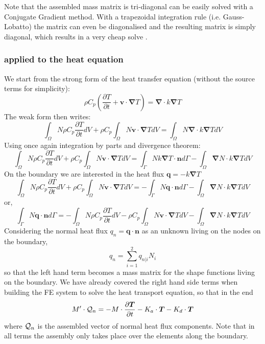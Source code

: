 Note that the assembled mass matrix is tri-diagonal can be easily solved with 
a Conjugate Gradient method. With a trapezoidal integration rule 
(i.e. Gauss-Lobatto) the matrix can even be diagonalised and the resulting 
matrix is simply diagonal, which results in a very cheap solve \cite{zhgh93}.

\subsubsection{applied to the heat equation}
We start from the strong form of the heat transfer equation (without the source terms for simplicity):
\[
\rho C_p
\left(\frac{\partial T}{\partial t} + {\bm v}\cdot {\bm \nabla}T\right)
=
{\bm \nabla} \cdot k{\bm \nabla T}
\]
The weak form then writes:
\[
\int_\Omega N
\rho C_p
\frac{\partial T}{\partial t} dV 
+
\rho C_p
\int_\Omega N
 {\bm v}\cdot {\bm \nabla}T  dV
=
\int_\Omega N
{\bm \nabla} \cdot k{\bm \nabla T} dV
\]
Using once again integration by parts and divergence theorem:
\[
\int_\Omega N
\rho C_p
\frac{\partial T}{\partial t} dV 
+
\rho C_p
\int_\Omega N
 {\bm v}\cdot {\bm \nabla}T  dV
=
\int_\Gamma N k {\bm \nabla T} \cdot {\bm n} d\Gamma
-
\int_\Omega  {\bm \nabla} N \cdot k{\bm \nabla T} dV
\]
On the boundary we are interested in the heat flux ${\bm q}=-k {\bm \nabla T}$
\[
\int_\Omega N
\rho C_p
\frac{\partial T}{\partial t} dV 
+
\rho C_p
\int_\Omega N
 {\bm v}\cdot {\bm \nabla}T  dV
=
-\int_\Gamma N {\bm q} \cdot {\bm n} d\Gamma
- \int_\Omega  {\bm \nabla} N \cdot k{\bm \nabla T} dV
\]
or,
\[
\int_\Gamma N {\bm q} \cdot {\bm n} d\Gamma
=
-\int_\Omega N
\rho C_p
\frac{\partial T}{\partial t} dV 
-\rho C_p
\int_\Omega N
 {\bm v}\cdot {\bm \nabla}T  dV
- \int_\Omega  {\bm \nabla} N \cdot k{\bm \nabla T} dV
\]
Considering the normal heat flux $q_n = {\bm q} \cdot {\bm n}$ as an unknown 
living on the nodes on the boundary, 
\[
q_n = \sum_{i=1}^2 q_{n|i} N_i
\]
so that the left hand term becomes a mass matrix for the shape functions living on 
the boundary.
We have already covered the right hand side terms when building the FE system 
to solve the heat transport equation, so that in the end 
\[
M' \cdot {\cal Q}_n =
- M \cdot \frac{\partial \bm T}{\partial t} -K_a \cdot {\bm T} - K_d \cdot {\bm T} 
\]
where ${\cal Q}_n$ is the assembled vector of normal heat flux components.
Note that in all terms the assembly only takes place over the elements along the boundary.



